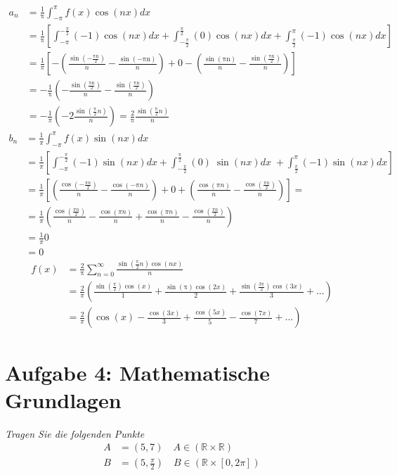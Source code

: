 \documentclass[
  ngerman,
  DIV=14
]{scrartcl}
\begin{document}
\begin{align*}
a_n 
  &= \frac{1}{\mathrm\pi}
  \int_{-\pi}^\pi f(x)\cos(n x) dx\\
  &= \frac{1}{\mathrm\pi} \left[\int_{-\pi}^{-\frac{\pi}{2}} (-1) \cos(n x) dx + \int_{-\frac{\pi}{2}}^\frac{\pi}{2} (0) \cos(n x) dx + \int_\frac{\pi}{2}^\pi (-1) \cos(n x) dx\right]\\
&=\frac{1}{\pi}\left[-\left(\frac{\sin(-\frac{\mathrm{πn}}2)}n-\frac{\sin(-\mathrm{πn})}n\right)+0-\left(\frac{\sin(\mathrm{πn})}n-\frac{\sin(\frac{\mathrm{πn}}2)}n\right)\right]\\
&=-\frac1{\mathrm\pi}\left(-\frac{\sin(\frac{\mathrm{πn}}2)}n-\frac{\sin(\frac{\mathrm{πn}}2)}n\right)\\
&=-\frac{1}{\pi}\left(-2\frac{\sin(\frac{\mathrm\pi}2n)}{\displaystyle n}\right)=\frac2{\mathrm\pi}\frac{\sin(\frac{\mathrm\pi}{2} n)}{n}
\end{align*}
\begin{align*}
b_n 
&= \frac{1}{\pi} \int_{-\pi}^\pi f(x) \sin(n x) dx\\
& =\frac{1}{\pi} \left[\int_{-\pi}^{-\frac{\pi}{2}}(-1)\sin(n x) dx + \int_{-\frac{\pi}2}^\frac{\mathrm\pi}2(0)\;\sin(nx)dx\;+\int_\frac{\pi}{2}^\pi(-1)\sin(n x) dx\right]\\
&=\frac{1}{\pi}\left[\left(\frac{\cos(-\frac{\pi n}2)}n-\frac{\cos(-\pi n)}n\right)+0+\left(\frac{\cos(\pi n)}n-\frac{\cos(\frac{\pi n}{2})}n\right)\right]=\\
&=\frac{1}{\pi}\left(\frac{\cos(\frac{\pi n}2)}n-\frac{\cos(\pi n)}n+\frac{\cos(\pi n)}n-\frac{\cos(\frac{\pi n}2)}n\right)\\
&=\frac{1}{\pi}0\\
&=0
\end{align*}
\begin{align*}
f(x)
&= \frac{2}{\mathrm\pi}{\sum_{n=0}^\infty}\frac{\sin({\frac{\mathrm\pi}2}n)\cos(nx)}n\\
&=\frac2{\pi}\left(\frac{\sin({\frac{\pi}2})\cos(x)}1+\frac{\sin(\mathrm\pi)\cos(2x)}2+\frac{\sin({\frac{3\mathrm\pi}2})\cos(3x)}3+...\right)\\
&=\frac2{\pi}\left(\cos(x)-\frac{\cos(3x)}3+\frac{\cos(5x)}5-\frac{\cos(7x)}7+...\right)
\end{align*}


\section*{Aufgabe 4: Mathematische Grundlagen}

\emph{Tragen Sie die folgenden Punkte}
\begin{align*}
A &= (5, 7) \quad A \in (\mathbb{R} \times \mathbb{R})\\
B &= (5, \frac{\pi}{2}) \quad B \in (\mathbb{R} \times [0, 2\pi])
\end{align*}
\end{document}
